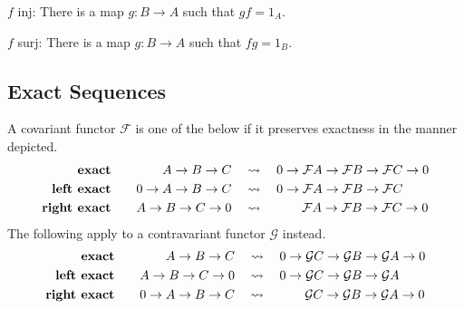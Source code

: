 \documentclass[twoside,10pt]{report}
\begin{document}
{\color{blue}
	$f$ inj: There is a map $g:B\to A$ such that $gf = 1_{A}$.

	$f$ surj: There is a map $g:B\to A$ such that $fg = 1_{B}$.
}


\subsection{Exact Sequences}

\begin{defn}[]
	A covariant functor $\mathcal{F}$ is one of the below if it preserves exactness in the manner depicted.
\begin{equation*}
        \begin{aligned}[c]
                \text{\textbf{exact}} \\
                \text{\textbf{left exact}} \\
                \text{\textbf{right exact}}
        \end{aligned}
        \qquad
        \begin{aligned}[c]
		A\to B\to C \quad&\leadsto\quad 0\to \mathcal{F}A\to \mathcal{F}B\to \mathcal{F}C\to 0\\
		0\to A\to B\to C \quad&\leadsto\quad 0\to \mathcal{F}A\to \mathcal{F}B\to \mathcal{F}C\\
		A\to B\to C\to 0 \quad&\leadsto\quad \qquad \mathcal{F}A\to \mathcal{F}B\to \mathcal{F}C\to 0
        \end{aligned}
\end{equation*}
The following apply to a contravariant functor $\mathcal{G}$ instead.
\begin{equation*}
        \begin{aligned}[c]
                \text{\textbf{exact}} \\
                \text{\textbf{left exact}} \\
                \text{\textbf{right exact}}
        \end{aligned}
        \qquad
        \begin{aligned}[c]
                A\to B\to C \quad&\leadsto\quad 0\to \mathcal{G}C\to \mathcal{G}B\to \mathcal{G}A\to 0\\
                A\to B\to C\to 0 \quad&\leadsto\quad 0\to \mathcal{G}C\to \mathcal{G}B\to \mathcal{G}A\\
                0\to A\to B\to C \quad&\leadsto\quad \qquad \mathcal{G}C\to \mathcal{G}B\to \mathcal{G}A\to 0
        \end{aligned}
\end{equation*}
\end{defn}
\end{document}
